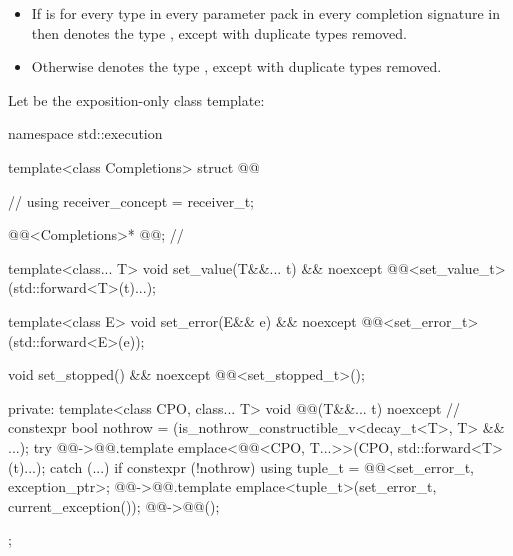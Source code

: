 \begin{itemize}
\item
If  is 
for every type 
in every parameter pack 
in every completion signature 
in  then
 denotes the type
,
except with duplicate types removed.

\item
Otherwise
 denotes the type
,
except with duplicate types removed.
\end{itemize}

\pnum
Let  be the exposition-only class template:

%
\begin{codeblock}
namespace std::execution {
  template<class Completions>
  struct @@ {                                // \expos
    using receiver_concept = receiver_t;

    @@<Completions>* @@;                // \expos

    template<class... T>
      void set_value(T&&... t) && noexcept {
        @@<set_value_t>(std::forward<T>(t)...);
      }

    template<class E>
      void set_error(E&& e) && noexcept {
        @@<set_error_t>(std::forward<E>(e));
      }

    void set_stopped() && noexcept {
      @@<set_stopped_t>();
    }

  private:
    template<class CPO, class... T>
      void @@(T&&... t) noexcept {                    // \expos
        constexpr bool nothrow = (is_nothrow_constructible_v<decay_t<T>, T> && ...);
        try {
          @@->@@.template emplace<@@<CPO, T...>>(CPO{},
                                                                   std::forward<T>(t)...);
        }
        catch (...) {
          if constexpr (!nothrow) {
            using tuple_t = @@<set_error_t, exception_ptr>;
            @@->@@.template emplace<tuple_t>(set_error_t{}, current_exception());
          }
        }
        @@->@@();
      }
  };
}
\end{codeblock}

